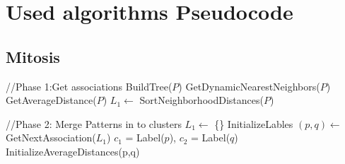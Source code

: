 
\chapter{Used algorithms Pseudocode} %

\label{AppendixA} %


\section{Mitosis}


\begin{algorithmic}
\State //Phase 1:Get associations
\State BuildTree($P$)		
\State GetDynamicNearestNeighbors($P$) 
\State GetAverageDistance($P$)		
\State $L_1\gets$ SortNeighborhoodDistances($P$)	

\State //Phase 2: Merge Patterns in to clusters
\State $L_1\gets$ \{\}
\State InitializeLables
\Repeat  \newline
	$(p,q) \gets$ GetNextAssociation($L_1$)
\State $c_1$ = Label($p$), $c_2$ = Label($q$)
\State InitializeAverageDistances(p,q)	  	

\end{algorithmic}